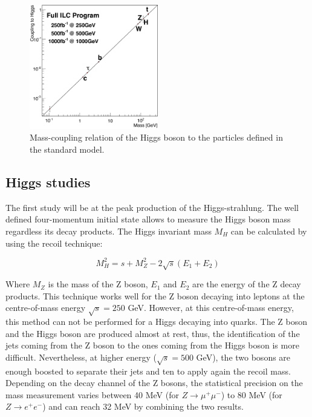     \begin{figure}[!h]
      \centering
      \includegraphics[width = 0.5\textwidth]{Pictures/Higgs/Chapter_Theory_figs_mass-coupling1TeV.png}
      \caption{Mass-coupling relation of the Higgs boson to the particles defined in the standard model\cite{tian}.}
      \label{fig:coupling}
    \end{figure}

    \subsection{Higgs studies}

    The first study will be at the peak production of the Higgs-strahlung. 
    The well defined four-momentum initial state allows to measure the Higgs boson mass regardless its decay products.
    The Higgs invariant mass $M_H$ can be calculated by using the recoil technique:

    \begin{equation}
      M^2_H = s + M^2_Z - 2 \sqrt{s}\left(E_{1} + E_{2}\right)
    \end{equation}

    Where $M_Z$ is the mass of the Z boson, $E_1$ and $E_2$ are the energy of the Z decay products. 
    This technique works well for the Z boson decaying into leptons at the centre-of-mass energy $\sqrt{s} = 250$ GeV.
    However, at this centre-of-mass energy, this method can not be performed for a Higgs decaying into quarks. 
    The Z boson and the Higgs boson are produced almost at rest, thus, the identification of the jets coming from the Z boson to the ones coming from the Higgs boson is more difficult.
    Nevertheless, at higher energy ($\sqrt{s} = 500$ GeV), the two bosons are enough boosted to separate their jets and ten to apply again the recoil mass.
    Depending on the decay channel of the Z bosons, the statistical precision on the mass measurement varies between 40 MeV (for $Z \rightarrow \mu^+\mu^-$) to 80 MeV (for $Z \rightarrow e^+e^-$) and can reach 32 MeV by combining the two results.

